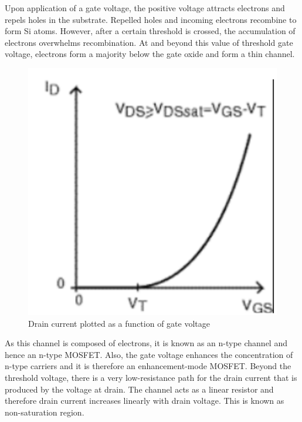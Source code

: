  
\noindent Upon application of a gate voltage, the positive voltage attracts electrons and repels holes in the substrate. Repelled holes and incoming electrons recombine to form Si atoms. However, after a certain threshold is crossed, the accumulation of electrons overwhelms recombination. At and beyond this value of threshold gate voltage, electrons form a majority below the gate oxide and form a thin channel.

\begin{figure}[H]
\centering
\includegraphics[scale=0.5]{./fig23} %
\caption{Drain current plotted as a function of gate voltage}
\label{3.23} %
\end{figure}
 

\noindent As this channel is composed of electrons, it is known as an n-type channel and hence an n-type MOSFET. Also, the gate voltage enhances the concentration of n-type carriers and it is therefore an enhancement-mode MOSFET. Beyond the threshold voltage, there is a very low-resistance path for the drain current that is produced by the voltage at drain. The channel acts as a linear resistor and therefore drain current increases linearly with drain voltage. This is known as non-saturation region. 

